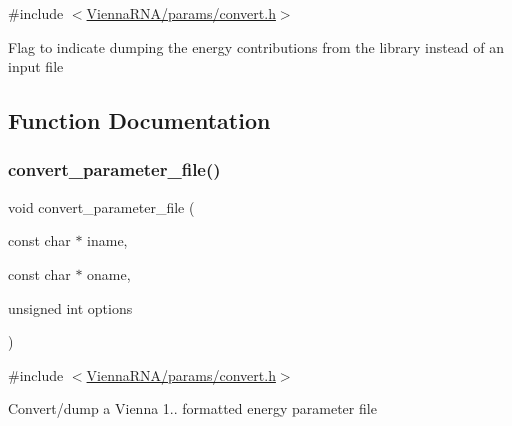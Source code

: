 {\ttfamily \#include $<$\mbox{\hyperlink{convert_8h}{Vienna\+R\+N\+A/params/convert.\+h}}$>$}

Flag to indicate dumping the energy contributions from the library instead of an input file 

\subsection{Function Documentation}
\mbox{\label{group__energy__parameters__convert_gafbe538bc4eb2cf2a33326e1010005f8a}} 
\subsubsection{\texorpdfstring{convert\_parameter\_file()}{convert\_parameter\_file()}}
{\footnotesize\ttfamily void convert\+\_\+parameter\+\_\+file (\begin{DoxyParamCaption}\item[{const char $\ast$}]{iname,  }\item[{const char $\ast$}]{oname,  }\item[{unsigned int}]{options }\end{DoxyParamCaption})}



{\ttfamily \#include $<$\mbox{\hyperlink{convert_8h}{Vienna\+R\+N\+A/params/convert.\+h}}$>$}

Convert/dump a Vienna 1.. formatted energy parameter file


